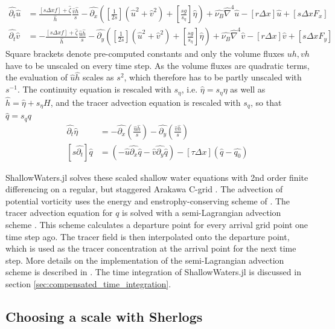 \begin{align}
\hat{\partial_t}\hat{u} &= \frac{[s\Delta x f]+ \hat{\zeta}}{\hat{h}}\frac{\hat{v}\hat{h}}{s} -\hat{\partial_x}
\left([\frac{1}{2s}](\hat{u}^2 + \hat{v}^2) + [\frac{sg}{s_\eta}]\hat{\eta} \right) + \hat{\nu_B} \hat{\nabla}^4 \hat{u}
- [r\Delta x]\hat{u} + [s\Delta x F_x] \nonumber \\
\hat{\partial_t}\hat{v} &= - \frac{[s\Delta x f]+ \hat{\zeta}}{\hat{h}}\frac{\hat{u}\hat{h}}{s} -\hat{\partial_y}
\left([\frac{1}{2s}](\hat{u}^2 + \hat{v}^2) + [\frac{sg}{s_\eta}]\hat{\eta} \right) + \hat{\nu_B} \hat{\nabla}^4 \hat{v}
- [r\Delta x]\hat{v} + [s\Delta x F_y]
\end{align}
Square brackets denote pre-computed constants and only the volume fluxes $uh,vh$ have to be unscaled on every time step.
As the volume fluxes are quadratic terms, the evaluation of $\hat{u}\hat{h}$ scales as $s^2$, which therefore has to be
partly unscaled with $s^{-1}$. The continuity equation is rescaled with $s_\eta$, i.e. $\hat{\eta} = s_\eta \eta$ as well as
$\hat{h} = \hat{\eta} + s_\eta H$, and the tracer advection equation is rescaled with $s_q$, so that $\hat{q} = s_q q$
\begin{align}
\hat{\partial_t} \hat{\eta} &= -\hat{\partial_x}(\frac{\hat{u}\hat{h}}{s}) - \hat{\partial_y}(\frac{\hat{v}\hat{h}}{s}) \nonumber \\
[s\hat{\partial_t}] \hat{q} &= \left(-\hat{u}\hat{\partial_x} \hat{q} - \hat{v}\hat{\partial_y} \hat{q}\right) - [\tau \Delta x](\hat{q} - \hat{q_0})
\end{align}

ShallowWaters.jl solves these scaled shallow water equations with 2nd order finite differencing on a regular,
but staggered Arakawa C-grid \citep{Arakawa1977}. The advection of potential vorticity uses the energy
and enstrophy-conserving scheme of \cite{Arakawa1990}. The tracer advection equation for $q$ is solved
with a semi-Lagrangian advection scheme \citep{Diamantakis2013,Smolarkiewicz1992}. This scheme calculates
a departure point for every arrival grid point one time step ago. The tracer field is then interpolated onto the departure point,
which is used as the tracer concentration at the arrival point for the next time step. More details on the implementation of
the semi-Lagrangian advection scheme is described in \citep{Klower2020b}. The time integration of ShallowWaters.jl is
discussed in section \ref{sec:compensated_time_integration}.

\subsection{Choosing a scale with Sherlogs}
\label{sec:scale_sherlogs}

